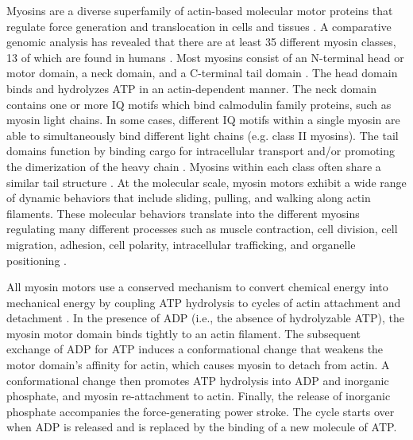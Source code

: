 \documentclass{ucetd}
\begin{document}
Myosins are a diverse superfamily of actin-based molecular motor proteins that regulate force generation and translocation in cells and tissues \cite{Sellers:2000ub,VicenteManzanares:2009ik}.  A comparative genomic analysis has revealed that there are at least 35 different myosin classes, 13 of which are found in humans \cite{Odronitz:2007hn,Sweeney:2010fg}.  Most myosins consist of an N-terminal head or motor domain, a neck domain, and a C-terminal tail domain \cite{Mooseker:2007ij}.  The head domain binds and hydrolyzes ATP in an actin-dependent manner.  The neck domain contains one or more IQ motifs which bind calmodulin family proteins, such as myosin light chains.  In some cases, different IQ motifs within a single myosin are able to simultaneously bind different light chains (e.g. class II myosins).  The tail domains function by binding cargo for intracellular transport and/or promoting the dimerization of the heavy chain \cite{Sellers:2000ub}.  Myosins within each class often share a similar tail structure \cite{Krendel:2005ko}.  At the molecular scale, myosin motors exhibit a wide range of dynamic behaviors that include sliding, pulling, and walking along actin filaments.  These molecular behaviors translate into the different myosins regulating many different processes such as muscle contraction, cell division, cell migration, adhesion, cell polarity, intracellular trafficking, and organelle positioning \cite{Sellers:2000ub,VicenteManzanares:2009ik}.  



All myosin motors use a conserved mechanism to convert chemical energy into mechanical energy by coupling ATP hydrolysis to cycles of actin attachment and detachment \cite{DeLaCruz:2004fq}.  In the presence of ADP (i.e., the absence of hydrolyzable ATP), the myosin motor domain binds tightly to an actin filament.  The subsequent exchange of ADP for ATP induces a conformational change that weakens the motor domain's affinity for actin, which causes myosin to detach from actin.  A conformational change then promotes ATP hydrolysis into ADP and inorganic phosphate, and myosin re-attachment to actin.  Finally, the release of inorganic phosphate accompanies the force-generating power stroke.  The cycle starts over when ADP is released and is replaced by the binding of a new molecule of ATP.  
\end{document}
